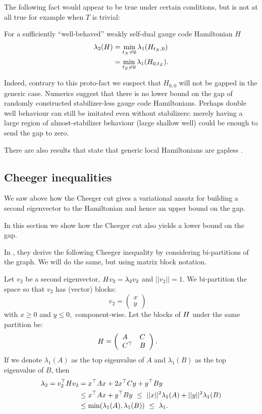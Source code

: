 \documentclass[12pt]{article}
\renewenvironment{framed}
{\begin{samepage}
\MakeFramed{\hsize0.8\linewidth\advance\hsize-\width\FrameRestore}}
{\endMakeFramed\end{samepage}}
\begin{document}
The following fact would appear to be true under certain conditions,
but is not at all true for example when $T$ is trivial:
\begin{framed}
For a sufficiently ``well-behaved''
weakly self-dual
gauge code Hamiltonian $H$
\begin{align*}
\lambda_2(H) 
    &= \min_{t_X\ne 0} \lambda_1(H_{t_X,0})\\
    &= \min_{t_Z\ne 0} \lambda_1(H_{0,t_Z}).
\end{align*}
\end{framed}
Indeed, contrary to this proto-fact
we suspect that $H_{0,0}$ will not be gapped in
the generic case. 
Numerics suggest that
there is no lower bound on the gap of 
randomly constructed stabilizer-less gauge code Hamiltonians.
Perhaps double well behaviour can still be imitated even without
stabilizers: merely having a large region of almost-stabilizer
behaviour (large shallow well) could be enough to send the gap to zero.

There are also results that state that generic 
local Hamiltonians are gapless \cite{Movassagh2016}.

\subsection{Cheeger inequalities}

We saw above how the Cheeger cut gives a variational ansatz
for building a second eigenvector to the Hamiltonian and hence
an upper bound on the gap.

In this section we show how the Cheeger cut also 
yields a lower bound on the gap.

In \cite{Friedland2002}, they derive the following Cheeger inequality
by considering bi-partitions of the graph. We will do the
same, but using matrix block notation.

Let $v_2$ be a second eigenvector, $ H v_2 = \lambda_2 v_2 $ 
and $||v_2||=1$.
We bi-partition the space 
so that $v_2$ has (vector) blocks:
$$
v_2 = \left( \begin{array}{l}
x\\
y\end{array} \right)\quad
$$
with $x\ge 0$ and $y\le 0,$ component-wise.
Let the blocks of $H$ under the same partition be:
$$
H = \left( \begin{array}{ll}
A&C\\
C^\top&B\end{array} \right).\quad
$$
If we denote $\lambda_1(A)$ as the top eigenvalue of $A$ and
$\lambda_1(B)$ as the top eigenvalue of $B$,
then
\begin{align*}
\lambda_2 = v_2^\top H v_2 &= x^\top A x + 2 x^\top C y + y^\top B y \\
        &\le x^\top A x + y^\top B y\ \le\ ||x||^2 \lambda_1(A) + ||y||^2 \lambda_1(B) \\
        &\le \mbox{min}(\lambda_1(A), \lambda_1(B))\ \le\ \lambda_1.
\end{align*}
\end{document}
